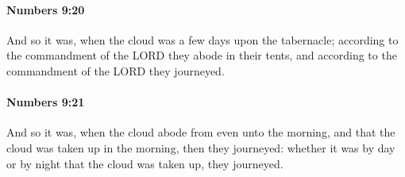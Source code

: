 		\paragraph{Numbers 9:20} %
			\label{NUMBERS-9-20}

			And so it was, when the cloud was a few days upon the tabernacle; according to the commandment of the LORD they abode in their tents, and according to the commandment of the LORD they journeyed.


		\paragraph{Numbers 9:21} %
			\label{NUMBERS-9-21}

			And so it was, when the cloud abode from even unto the morning, and that the cloud was taken up in the morning, then they journeyed: whether it was by day or by night that the cloud was taken up, they journeyed.

